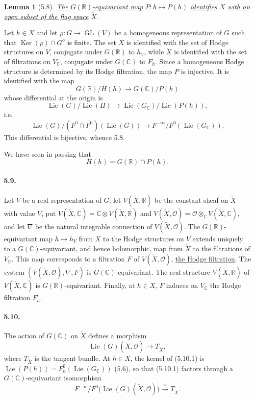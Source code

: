 \documentclass[10pt,leqno]{article}
\newcommand{\C}{\mathbb C}
\newcommand{\R}{\mathbb R}
\newcommand{\cO}{\mathcal O}
\newcommand{\Ker}{\operatorname{Ker}}
\theoremstyle{deligne}
\newtheorem*{lemma}{Lemma}
\newcommand{\Lie}{\operatorname{Lie}}
\newcommand{\GL}{\operatorname{GL}}
\renewcommand{\underline}[1]{\uline{#1}}
\begin{document}
\begin{lemma}[5.8]
\underline{The $G(\R)$-equivariant map} $P:h\mapsto P(h)$ \underline{identifies} $X$ \underline{with an open subset of the flag space} $\check X$.
\end{lemma}

Let $h\in X$ and let $\rho:G\to\GL(V)$ be a homogeneous representation of $G$ such that $\Ker(\rho)\cap G^o$ is finite. The set $X$ is identified with the set of Hodge structures on $V$, conjugate under $G(\R)$ to $h_V$, while $\check X$ is identified with the set of filtrations on $V_\C$, conjugate under $G(\C)$ to $F_h$. Since a homogeneous Hodge structure is determined by its Hodge filtration, the map $P$ is injective. It is identified with the map
\[
  G(\R)/H(h)\longrightarrow G(\C)/P(h)
\]
whose differential at the origin is
\[
  \Lie(G)/\Lie(H)\longrightarrow \Lie(G_\C)/\Lie(P(h)),
\]
i.e.
\[
  \Lie(G)/(F^0\cap\overline{F^0})(\Lie(G))
  \longrightarrow
  F^{-\infty}/F^0(\Lie(G_\C)).
\]
This differential is bijective, whence 5.8.

We have seen in passing that
\[
\tag{5.8.1}
  H(h)=G(\R)\cap P(h).
\]

\paragraph{5.9.}
Let $V$ be a real representation of $G$, let $V(\check X,\R)$ be the constant sheaf on $\check X$ with value $V$, put $V(\check X,\C)=\C\otimes V(\check X,\R)$ and $V(\check X,\cO)=\cO\otimes_\C V(\check X,\C)$, and let $\nabla$ be the natural integrable connection of $V(\check X,\cO)$. The $G(\R)$-equivariant map $h\mapsto h_V$ from $X$ to the Hodge structures on $V$ extends uniquely to a $G(\C)$-equivariant, and hence holomorphic, map from $\check X$ to the filtrations of $V_\C$. This map corresponds to a filtration $F$ of $V(\check X,\cO)$, \underline{the Hodge filtration}. The system $(V(\check X,\cO),\nabla,F)$ is $G(\C)$-equivariant. The real structure $V(\check X,\R)$ of $V(\check X,\C)$ is $G(\R)$-equivariant. Finally, at $h\in X$, $F$ induces on $V_\C$ the Hodge filtration $F_h$.

\paragraph{5.10.}
The action of $G(\C)$ on $\check X$ defines a morphism
\[
\tag{5.10.1}
  \Lie(G)(\check X,\cO)\longrightarrow T_{\check X},
\]
where $T_{\check X}$ is the tangent bundle. At $h\in X$, the kernel of (5.10.1) is $\Lie(P(h))=F_h^0(\Lie(G_\C))$ (5.6), so that (5.10.1) factors through a $G(\C)$-equivariant isomorphism
\[
\tag{5.10.2}
  F^{-\infty}/F^0\bigl(\Lie(G)(\check X,\cO)\bigr)
  \xrightarrow{\sim} T_{\check X}.
\]
\end{document}
